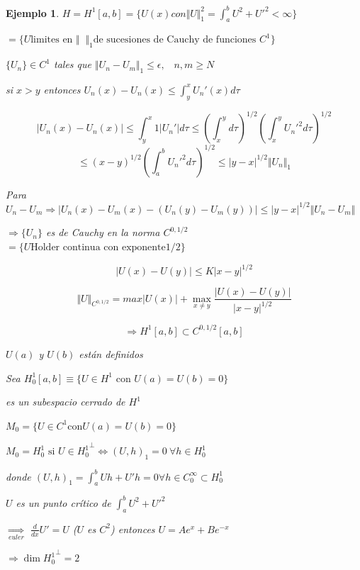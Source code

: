 \documentclass[a4paper,10pt]{book}
\def \ep{\epsilon}
\newtheorem{ejemplo}{Ejemplo}
\begin{document}
\begin{ejemplo}
    $H=H^1[a,b] = \{ U(x) con \Vert U \Vert_1^2= \int_a^b U^2 + {U'}^2 < \infty \}$

    $= \{ U \text{limites en }  \Vert\;\; \Vert_1 \text{de sucesiones de Cauchy de funciones } C^1 \}$

    $\{ U_n \}\in C^1$  tales que $\Vert U_n - U_m\Vert_1 \leq \ep, \; \;\; n,m\geq N$ 
    
    si $x>y$  entonces $U_n(x)-U_n(x)\leq \int_y^x U_n'(x) d\tau $

    \[| U_n(x)-U_n(x) | \leq \int_y^x 1 |U_n'| d\tau \leq \left(  \int_x^y  d\tau \right)^{1/2}  \left( \int_x^y {U_n'}^2 d\tau \right)^{1/2} \]
    \[ \leq (x-y)^{1/2} \left(\int_a^b {U_n'}^2 d\tau \right)^{1/2} \leq |y-x|^{1/2} \Vert U_n \Vert_1\]

    Para $U_n-U_m \Rightarrow | U_n(x) - U_m(x) - ( U_n(y) -U_m(y) )| \leq |y-x|^{1/2}\Vert U_n-U_m \Vert$ 

    $\Rightarrow \{ U_n\}$ es de Cauchy en la norma $C^{0,1/2}$ 
    $=\{ U \text{Holder continua con exponente} 1/2 \}  $

    \[ |U(x)-U(y)|\leq K |x-y|^{1/2}\]

    \[\Vert U\Vert_{C^{0,1/2} } = max | U(x) | + \underset{x\neq y} { \max  } \frac{|U(x)-U(y)|}{|x-y|^{1/2}} \]

    
    \[\Rightarrow H^1[a,b] \subset C^{0,1/2}[a,b]\]
    
    $U(a)$ y $U(b)$ están definidos

    
    Sea  $ H_0^1[a,b] \equiv \{ U \in H^1 \text{ con } U(a)=U(b)= 0 \}$

    es un subespacio cerrado de $H^1$

    $M_0= \{ U \in C^1 \text{con} U(a)= U(b)= 0 \}$

    $M_0= H_0^1 \text{  si  } U\in {H_0^1}^\perp \Leftrightarrow (U,h)_1=0   \: \forall h \in H_0^1 $

    donde $(U,h)_1 = \int_a^b U h + U' h =0 \forall h \in C_0^\infty \subset H_0^1$

    $U$ es un punto crítico de $\int_a^b U^2 + {U'}^2 $  

    $\underset{euler}{\Rightarrow}$ $\frac{d}{dx} U'= U$   ($U$ es $C^2$)  entonces $U=Ae^{x} + B e^{-x}$

    $\Rightarrow \dim {H_0^1}^\perp = 2 $
    
    
\end{ejemplo}
\end{document}
